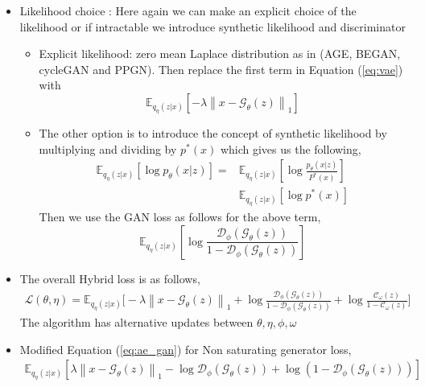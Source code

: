 \begin{itemize}
\item Likelihood choice : Here again we can make an explicit choice of the likelihood or if intractable we introduce synthetic likelihood and discriminator
\begin{itemize}
    \item Explicit likelihood: zero mean Laplace distribution as in (AGE, BEGAN, cycleGAN and PPGN). Then replace the first term in Equation (\ref{eq:vae}) with
    $$
\mathbb{E}_{q_{\eta}(z | x)}\left[-\lambda\left\|x-\mathcal{G}_{\theta}(z)\right\|_{1}\right]
$$
\item The other option is to introduce the concept of synthetic likelihood by multiplying and dividing by $p^*(x)$ which gives us the following,
\begin{equation*}
    \begin{aligned}
    \mathbb{E}_{q_{\eta}(z | x)}\left[\log p_{\theta}(x | z)\right]=&\mathbb{E}_{q_{\eta}(z | x)}\left[\log \frac{p_{\theta}(x | z)}{P^{*}(x)}\right] \\
    & \mathbb{E}_{q_{\eta}(z | x)}\left[\log p^{*}(x)\right]
    \end{aligned}{}
\end{equation*}{}
Then we use the GAN loss as follows for the above term,
$$
\mathbb{E}_{q_{\eta}(z| x)}\left[\log \frac{\mathcal{D}_{\phi}\left(\mathcal{G}_{\theta}(z)\right)}{1-\mathcal{D}_{\phi}\left(\mathcal{G}_{\theta}(z)\right)}\right]
$$
\end{itemize}
\item The overall Hybrid loss is as follows,
\begin{equation}
\label{eq:ae_gan}   
\begin{aligned}
\mathcal{L}(\theta,\eta)= \mathbb{E}_{q_{\eta}(z | x)}\bigg[-\lambda\left\|x-\mathcal{G}_{\theta}(z)\right\|_{1} 
+ \log \frac{\mathcal{D}_{\phi}\left(\mathcal{G}_{\theta}(z)\right)}{1-\mathcal{D}_{\phi}\left(\mathcal{G}_{\theta}(z)\right)}+\log \frac{\mathcal{C}_{\omega}(z)}{1-\mathcal{C}_{\omega}(z)}\bigg]
\end{aligned}{}
\end{equation}
The algorithm has alternative updates between $\theta, \eta, \phi, \omega$
\item Modified Equation (\ref{eq:ae_gan}) for Non saturating generator loss,
\begin{equation*}
    \begin{aligned}
    \mathbb{E}_{q_{\eta}(z | x)}[\lambda\left\|x-\mathcal{G}_\theta(z)\right\|_{1}-\log \mathcal{D}_{\phi}\left(\mathcal{G}_{\theta}(z)\right)  
    + \log \left(1-\mathcal{D}_{\phi}\left(\mathcal{G}_{\theta}(z)\right)\right)]
    \end{aligned}{}
\end{equation*}{}
\end{itemize}

